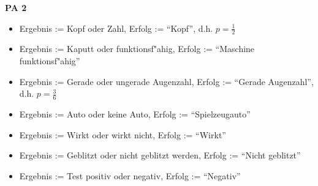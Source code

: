 \documentclass[a4paper,12pt]{article}
\newcommand{\PAufgabe}[1]{
        {
        \vspace*{0.5cm}
        \textbf{PA #1}
        \vspace*{0.2cm}
    }
}
\begin{document}
    \PAufgabe{2}
    \begin{itemize}
        \item Ergebnis := Kopf oder Zahl, Erfolg := ``Kopf'', d.h. $ p = \frac{1}{2} $
        \item Ergebnis := Kaputt oder funktionsf"ahig, Erfolg := ``Maschine funktionsf"ahig''
        \item Ergebnis := Gerade oder ungerade Augenzahl, Erfolg := ``Gerade Augenzahl'', d.h. $ p = \frac{3}{6} $
        \item Ergebnis := Auto oder keine Auto, Erfolg := ``Spielzeugauto''
        \item Ergebnis := Wirkt oder wirkt nicht, Erfolg := ``Wirkt''
        \item Ergebnis := Geblitzt oder nicht geblitzt werden, Erfolg := ``Nicht geblitzt''
        \item Ergebnis := Test positiv oder negativ, Erfolg := ``Negativ''
    \end{itemize}
\end{document}
